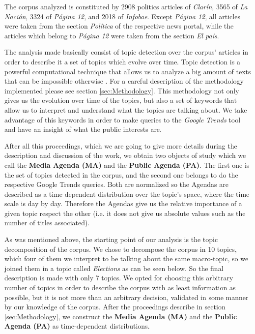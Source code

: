 \documentclass{bmcart}
\begin{document}
\par The corpus analyzed is constituted by 2908 politics articles of \emph{Clarín}, 3565 of \emph{La Nación}, 3324 of \emph{Página 12}, and 2018 of \emph{Infobae}. Except \emph{Página 12}, all articles were taken from the section \emph{Política} of the respective news portal, while the articles which belong to \emph{Página 12} were taken from the section \emph{El país}.

\par The analysis made basically consist of topic detection over the corpus' articles in order to describe it a set of topics which evolve over time. Topic detection is a powerful computational technique that allows us to analyze a big amount of texts that can be impossible otherwise \cite{griffiths2004finding}. For a careful description of the methodology implemented please see section \ref{sec:Methodology}. 
This methodology not only gives us the evolution over time of the topics, but also a set of keywords that allow us to interpret and understand what the topics are talking about. 
We take advantage of this keywords in order to make queries to the \emph{Google Trends} tool and have an insight of what the public interests are. 
\par After all this proceedings, which we are going to give more details during the description and discussion of the work, we obtain two objects of study which we call the \textbf{Media Agenda (MA)} and the \textbf{Public Agenda (PA)}. 
The first one is the set of topics detected in the corpus, and the second one belongs to do the respective Google Trends queries. 
Both are normalized so the Agendas are described as a time dependent distribution over the topic's space, where the time scale is day by day.
Therefore the Agendas give us the relative importance of a given topic respect the other (i.e. it does not give us absolute values such as the number of titles associated).

\par As was mentioned above, the starting point of our analysis is the topic decomposition of the corpus.
We chose to decompose the corpus in 10 topics, which four of them we interpret to be talking about the same macro-topic, so we joined them in a topic called \emph{Elections} as can be seen below. So the final description is made with only 7 topics.
We opted for choosing this arbitrary number of topics in order to describe the corpus with as least information as possible, but it is not more than an arbitrary decision, validated in some manner by our knowledge of the corpus.
After the proceedings describe in section \ref{sec:Methodology}, we construct the \textbf{Media Agenda (MA)} and the \textbf{Public Agenda (PA)} as time-dependent distributions.
\end{document}
